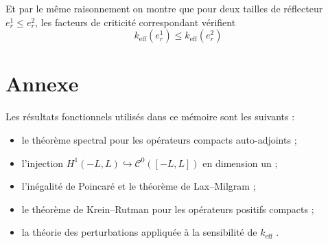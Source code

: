 \documentclass{article}
\newcommand{\keff}{k_{\mathrm{eff}}}
\begin{document}
Et par le même raisonnement on montre que pour deux tailles de réflecteur $e_r^1 \le e_r^2$, les facteurs de criticité correspondant vérifient 
\[
\boxed{\keff(e_r^1) \le \keff(e_r^2)}
\]
\bigskip

\bigskip


\section{Annexe}

Les résultats fonctionnels utilisés dans ce mémoire sont les suivants :
\begin{itemize}
    \item le théorème spectral pour les opérateurs compacts auto-adjoints \cite{Brezis2011};
    \item l'injection $H^1(-L,L)\hookrightarrow\mathcal C^0([-L,L])$ en dimension un \cite{Brezis2011};
    \item l'inégalité de Poincaré et le théorème de Lax--Milgram \cite{Brezis2011,Evans2010};
    \item le théorème de Krein--Rutman pour les opérateurs positifs compacts \cite{KreinRutman1948,Schaefer1974};
    \item la théorie des perturbations appliquée à la sensibilité de $\keff$ \cite[chap.~6, section~6.6.2]{Allaire2018}.
\end{itemize}

\printbibliography
\end{document}
